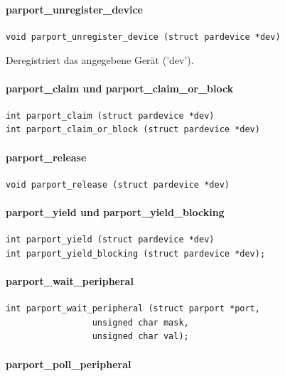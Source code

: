\documentclass[a4paper,11pt]{article}
\begin{document}
\paragraph{parport\_unregister\_device}

\begin{verbatim}
void parport_unregister_device (struct pardevice *dev)
\end{verbatim}

Deregistriert das angegebene Gerät ('dev').

\paragraph{parport\_claim und parport\_claim\_or\_block}

\begin{verbatim}
int parport_claim (struct pardevice *dev)
int parport_claim_or_block (struct pardevice *dev)
\end{verbatim}

\paragraph{parport\_release}

\begin{verbatim}
void parport_release (struct pardevice *dev)
\end{verbatim}

\paragraph{parport\_yield und parport\_yield\_blocking}

\begin{verbatim}
int parport_yield (struct pardevice *dev)
int parport_yield_blocking (struct pardevice *dev);
\end{verbatim}

\paragraph{parport\_wait\_peripheral}
\begin{verbatim}
int parport_wait_peripheral (struct parport *port,
			     unsigned char mask,
			     unsigned char val);
\end{verbatim}


\paragraph{parport\_poll\_peripheral}
\end{document}

